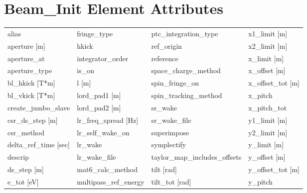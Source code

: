  \section{Beam_Init Element Attributes}
 \label{s:list.beam.init}
 
 \begin{tabular}{llll} \toprule
alias                            & fringe_type                      & ptc_integration_type             & x1_limit [m]                     \\
aperture [m]                     & hkick                            & ref_origin                       & x2_limit [m]                     \\
aperture_at                      & integrator_order                 & reference                        & x_limit [m]                      \\
aperture_type                    & is_on                            & space_charge_method              & x_offset [m]                     \\
bl_hkick [T*m]                   & l [m]                            & spin_fringe_on                   & x_offset_tot [m]                 \\
bl_vkick [T*m]                   & lord_pad1 [m]                    & spin_tracking_method             & x_pitch                          \\
create_jumbo_slave               & lord_pad2 [m]                    & sr_wake                          & x_pitch_tot                      \\
csr_ds_step [m]                  & lr_freq_spread [Hz]              & sr_wake_file                     & y1_limit [m]                     \\
csr_method                       & lr_self_wake_on                  & superimpose                      & y2_limit [m]                     \\
delta_ref_time [sec]             & lr_wake                          & symplectify                      & y_limit [m]                      \\
descrip                          & lr_wake_file                     & taylor_map_includes_offsets      & y_offset [m]                     \\
ds_step [m]                      & mat6_calc_method                 & tilt [rad]                       & y_offset_tot [m]                 \\
e_tot [eV]                       & multipass_ref_energy             & tilt_tot [rad]                   & y_pitch                          \\

\end{tabular}
